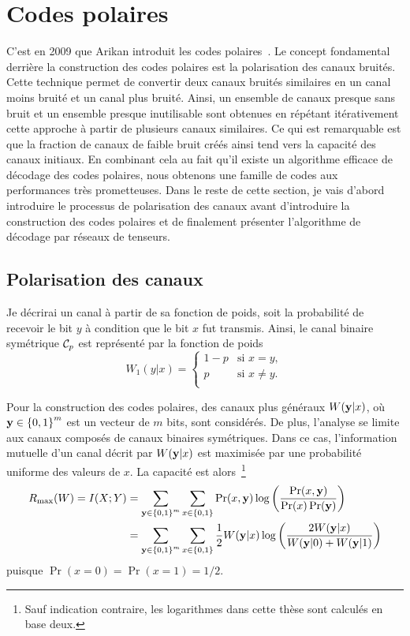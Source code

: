\section{Codes polaires}
\label{sec:codes_polaires}


C'est en 2009 que Arikan introduit les codes polaires~\cite{arikan_channel_2009}.
Le concept fondamental derrière la construction des codes polaires est la polarisation
des canaux bruités.
Cette technique permet de convertir deux canaux bruités similaires en un canal moins bruité
et un canal plus bruité.
Ainsi,
un ensemble de canaux presque sans bruit et un ensemble presque inutilisable
sont obtenues en répétant itérativement cette approche à partir de plusieurs canaux similaires.
Ce qui est remarquable est que la fraction de canaux de faible bruit créés ainsi
tend vers la capacité des canaux initiaux.
En combinant cela au fait qu'il existe un algorithme efficace de décodage des codes polaires,
nous obtenons une famille de codes aux performances très prometteuses.
Dans le reste de cette section,
je vais d'abord introduire le processus de polarisation des canaux
avant d'introduire la construction des codes polaires
et de finalement présenter l'algorithme de décodage par réseaux de tenseurs. 

\subsection{Polarisation des canaux}

Je décrirai un canal à partir de sa fonction de poids,
soit la probabilité de recevoir le bit $y$ à condition que le bit $x$ fut transmis.
Ainsi,
le canal binaire symétrique $\mathcal{C}_p$ est représenté par la fonction de poids
\begin{equation}
  W_1(y|x) =
  \begin{cases}
    1 - p & \text{si } x = y,\\
    p & \text{si } x \neq y.\\
  \end{cases}
\end{equation}

Pour la construction des codes polaires,
des canaux plus généraux $W(\vb y | x)$,
où $\vb y \in \qty{0, 1}^m$ est un vecteur de $m$ bits,
sont considérés.
De plus, 
l'analyse se limite aux canaux composés de canaux binaires symétriques.
Dans ce cas, l'information mutuelle d'un canal décrit par $W(\vb y | x)$
est maximisée par une probabilité uniforme des valeurs de $x$.
La capacité est alors~\footnote{
  Sauf indication contraire, les logarithmes dans cette thèse sont calculés en base deux.
}
\begin{align}
  R_{\text{max}}(W) 
  = I(X ; Y)
  &= \sum_{\vb y \in \qty{0, 1}^m}\sum_{x \in \qty{0, 1}} 
  \Pr(x, \vb y) \log\qty(\frac{\Pr(x, \vb y)}{\Pr(x) \Pr(\vb y)})\notag\\
  &= \sum_{\vb y \in \qty{0, 1}^m}\sum_{x \in \qty{0, 1}} 
  \frac{1}{2}W(\vb y | x) \log\qty(\frac{2 W(\vb y | x)}{W(\vb y | 0) + W(\vb y | 1)})
  \label{eq:capacite_symetrique}
\end{align}
puisque $\Pr(x = 0) = \Pr(x = 1) = 1/2$.

